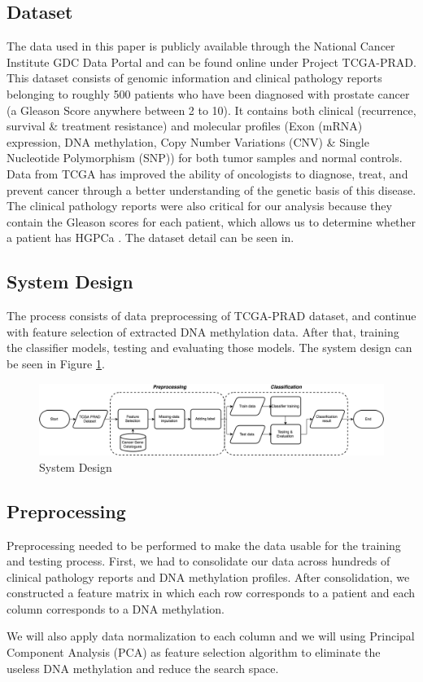 \documentclass[a4paper,oneside]{article}
\begin{document}
\subsection{Dataset}
The data used in this paper is publicly available through the National Cancer Institute GDC Data Portal and can be found online under Project TCGA-PRAD. This dataset consists of genomic information and clinical pathology reports belonging to roughly 500 patients who have been diagnosed with prostate cancer (a Gleason Score anywhere between 2 to 10). It contains both clinical (recurrence, survival \& treatment resistance) and molecular profiles (Exon (mRNA) expression, DNA methylation, Copy Number Variations (CNV) \& Single Nucleotide Polymorphism (SNP)) for both tumor samples and normal controls. Data from TCGA has improved the ability of oncologists to diagnose, treat, and prevent cancer through a better understanding of the genetic basis of this disease. The clinical pathology reports were also critical for our analysis because they contain the Gleason scores for each patient, which allows us to determine whether a patient has HGPCa \cite{two}. The dataset detail can be seen in.

\subsection{System Design}
The process consists of data preprocessing of TCGA-PRAD dataset, and continue with feature selection of extracted DNA methylation data. After that, training the classifier models, testing and evaluating those models. The system design can be seen in Figure \ref{fig:system_design}.

\begin{figure}
  \includegraphics[width=1\linewidth]{system_design}
  \centering
  \caption{System Design}
  \label{fig:system_design}
\end{figure}

\subsection{Preprocessing}
Preprocessing needed to be performed to make the data usable for the training and testing process. First, we had to consolidate our data across hundreds of clinical pathology reports and DNA methylation profiles. After consolidation, we constructed a feature matrix in which each row corresponds to a patient and each column corresponds to a DNA methylation.
\par
We will also apply data normalization to each column and we will using Principal Component Analysis (PCA) as feature selection algorithm to eliminate the useless DNA methylation and reduce the search space.
\end{document}
